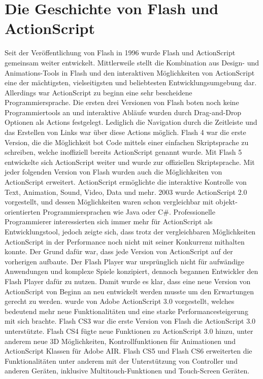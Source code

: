 \section{Die Geschichte von Flash und ActionScript}
Seit der Veröffentlichung von Flash in 1996 wurde Flash und ActionScript gemeinsam
weiter entwickelt. Mittlerweile stellt die Kombination aus Design- und Animations-Tools 
in Flash und den interaktiven Möglichkeiten von ActionScript eine der mächtigsten, 
vielseitigsten und beliebtesten Entwicklungsumgebung dar. Allerdings war ActionScript 
zu beginn eine sehr bescheidene Programmiersprache.
\newline\newline
Die ersten drei Versionen von Flash boten noch keine Programmiertools an und 
interaktive Abläufe wurden durch Drag-and-Drop Optionen als Actions festgelegt. 
Lediglich die Navigation durch die Zeitleiste und das Erstellen von Links war 
über diese Actions möglich.
\newline\newline
Flash 4 war die erste Version, die die Möglichkeit bot Code mittels einer einfachen
Skriptsprache zu schreiben, welche inoffiziell bereits ActionScript genannt wurde.
Mit Flash 5 entwickelte sich ActionScript weiter und wurde zur offiziellen Skriptsprache.
Mit jeder folgenden Version von Flash wurden auch die Möglichkeiten von ActionScript erweitert.
ActionScript ermöglichte die interaktive Kontrolle von Text, Animation, Sound, Video, Data und
mehr. 2003 wurde ActionScript 2.0 vorgestellt, und dessen Möglichkeiten waren schon
vergleichbar mit objekt-orientierten Programmiersprachen wie Java oder C\#.
\newline\newline
Professionelle Programmierer interessierten sich immer mehr für ActionScript als 
Entwicklungstool, jedoch zeigte sich, dass trotz der vergleichbaren Möglichkeiten 
ActionScript in der Performance noch nicht mit seiner Konkurrenz mithalten konnte.
Der Grund dafür war, dass jede Version von ActionScript auf der vorherigen aufbaute.
Der Flash Player war ursprünglich nicht für aufwändige Anwendungen und komplexe Spiele
konzipiert, dennoch begannen Entwickler den Flash Player dafür zu nutzen.
Damit wurde es klar, dass eine neue Version von ActionScript von Beginn an neu entwickelt
werden musste um den Erwartungen gerecht zu werden.
\newline{} wurde von Adobe ActionScript 3.0 vorgestellt, welches bedeutend mehr neue 
Funktionalitäten und eine starke Performancesteigerung mit sich brachte. Flash CS3 
war die erste Version von Flash die ActionScript 3.0 unterstützte. Flash CS4 
fügte neue Funktionen zu ActionScript 3.0 hinzu, unter anderem neue 3D Möglichkeiten,
Kontrollfunktionen für Animationen und ActionScript Klassen für Adobe AIR. Flash CS5 und
Flash CS6 erweiterten die Funktionalitäten unter anderem mit der Unterstützung von Controller 
und anderen Geräten, inklusive Multitouch-Funktionen und Touch-Screen Geräten.


